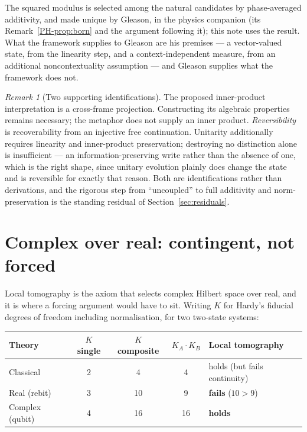 \documentclass[11pt,a4paper]{article}
\theoremstyle{remark}\newtheorem{remark}[definition]{Remark}
\begin{document}
The squared modulus is selected among the natural candidates by phase-averaged
additivity, and made unique by Gleason, in the physics companion (its
Remark~\ref{PH-prop:born} and the argument following it); this note uses the
result. What the framework supplies to Gleason \citep{gleason1957} are his premises
--- a vector-valued state, from the linearity step, and a context-independent
measure, from an additional noncontextuality assumption --- and Gleason supplies what the
framework does not.

\begin{remark}[Two supporting identifications]\label{rem:identifications}
The proposed inner-product interpretation is a cross-frame projection. Constructing its algebraic properties remains necessary; the metaphor does not supply an inner product. \emph{Reversibility} is recoverability from an injective free continuation. Unitarity additionally requires linearity and inner-product preservation; destroying no distinction alone is insufficient --- an information-preserving write rather than the absence of one,
which is the right shape, since unitary evolution plainly does change the state
and is reversible for exactly that reason. Both are identifications rather than
derivations, and the rigorous step from ``uncoupled'' to full additivity and
norm-preservation is the standing residual of Section~\ref{sec:residuals}.
\end{remark}

\section{Complex over real: contingent, not forced}\label{sec:complex}
Local tomography is the axiom that selects complex Hilbert space over real, and it
is where a forcing argument would have to sit. Writing $K$ for Hardy's fiducial
degrees of freedom including normalisation, for two two-state systems:

\begin{center}\small
\begin{tabular}{@{}lcccl@{}}
\toprule
\textbf{Theory} & $K$ \textbf{single} & $K$ \textbf{composite} & $K_A\!\cdot\!K_B$ & \textbf{Local tomography}\\
\midrule
Classical & 2 & 4 & 4 & holds (but fails continuity)\\
Real (rebit) & 3 & 10 & 9 & \textbf{fails} ($10>9$)\\
Complex (qubit) & 4 & 16 & 16 & \textbf{holds}\\
\bottomrule
\end{tabular}
\end{center}
\end{document}
